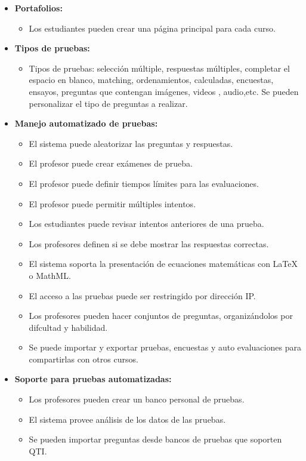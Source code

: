 	\begin{itemize}
		\item \textbf{Portafolios:}
			\begin{itemize}
				\item Los estudiantes pueden crear una página principal para cada curso.
			\end{itemize}
	\end{itemize}
	\begin{itemize}
		\item \textbf{Tipos de pruebas:}
			\begin{itemize}
				\item Tipos de pruebas: selección múltiple, respuestas múltiples, completar el espacio en blanco, matching, ordenamientos, calculadas, encuestas, ensayos, preguntas que contengan imágenes, videos , audio,etc. Se pueden personalizar el tipo de preguntas a realizar.
				
			\end{itemize}
	\end{itemize}
	\begin{itemize}
		\item \textbf{Manejo automatizado de pruebas:}
			\begin{itemize}
				\item El sistema puede aleatorizar las preguntas  y respuestas.
				\item El profesor puede crear exámenes de prueba.
				\item El profesor puede definir tiempos límites para las evaluaciones.
				\item El profesor puede permitir múltiples intentos.
				\item Los estudiantes puede revisar intentos anteriores de una prueba.
				\item Los profesores definen si se debe mostrar las respuestas correctas.
				\item El sistema soporta la presentación de ecuaciones matemáticas con LaTeX o MathML.
				\item El acceso a las pruebas puede ser restringido por dirección IP.
				\item Los profesores pueden hacer conjuntos de preguntas, organizándolos por difcultad y  habilidad.
				\item Se puede importar y exportar pruebas, encuestas y auto evaluaciones para compartirlas con otros cursos.
			\end{itemize}
	\end{itemize}
	\begin{itemize}
		\item \textbf{Soporte para pruebas automatizadas:}
			\begin{itemize}
				\item Los profesores pueden crear un banco personal de pruebas.
				\item El sistema provee análisis de los datos de las pruebas.
				\item Se pueden importar preguntas desde bancos de pruebas que soporten QTI.
			\end{itemize}
	\end{itemize}
